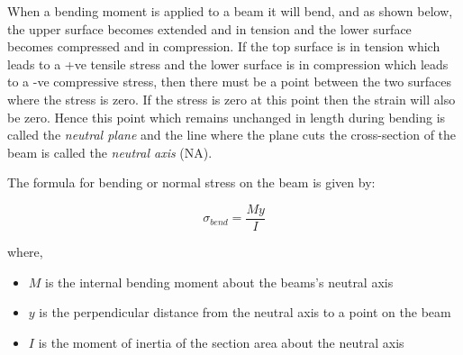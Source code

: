 \documentclass[12pt, letterpaper, twoside]{article}
\begin{document}
When a bending moment is applied to a beam it will bend, and as shown below, the upper surface becomes extended and in tension and the lower surface becomes compressed and in compression. If the top surface is in tension which leads to a +ve tensile stress and the lower surface is in compression which leads to a -ve compressive stress, then there must be a point between the two surfaces where the stress is zero. If the stress is zero at this point then the strain will also be zero. Hence this point which remains unchanged in length during bending is called the \emph{neutral plane} and the line where the plane cuts the cross-section of the beam is called the \emph{neutral axis} (NA).


\begin{center}
\end{center}

The formula for bending or normal stress on the beam is given by:


\begin{equation}
\sigma_{bend} = \frac{My}{I}
\end{equation}


where,
\begin{itemize}
	\item $M$ is the internal bending moment about the beams’s neutral axis
	\item $y$ is the perpendicular distance from the neutral axis to a point on the beam
	\item $I$ is the moment of inertia of the section area about the neutral axis
\end{itemize}
\end{document}
